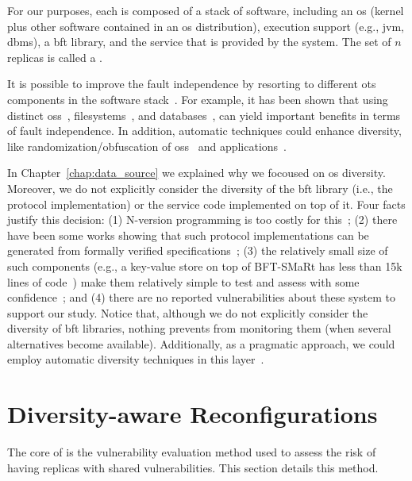 For our purposes, each \replica is composed of a stack of software, including an \gls{os} (kernel plus other software contained in an \gls{os} distribution), execution support (e.g., \gls{jvm}, \gls{dbms}), a \gls{bft} library, and the service that is provided by the system.
The set of $n$ replicas is called a \configuration.

It is possible to improve the \replicas fault independence by resorting to different \gls{ots} components in the software stack~\cite{Deswarte:1998}. 
For example, it has been shown that using distinct \glspl{os}~\cite{Garcia:2014}, filesystems~\cite{Castro:2003,Bairavasundaram:2009,Alagappan:2016}, and databases~\cite{Gashi:2007}, can yield important benefits in terms of fault independence. In addition, automatic techniques could enhance diversity, like randomization/obfuscation of \glspl{os}~\cite{Roeder:2010} and applications~\cite{King:2016}.

In Chapter~\ref{chap:data_source} we explained why we focoused on \gls{os} diversity. 
Moreover, we do not explicitly consider the diversity of the \gls{bft} library (i.e., the protocol implementation) or the service code implemented on top of it.
Four facts justify this decision: (1) N-version programming is too costly for this~\cite{Avizienis:1977}; (2) there have been some works showing that such protocol implementations can be generated from formally verified specifications~\cite{Hawblitzel:2015,Rahli:2018}; (3) the relatively small size of such components (e.g., a key-value store on top of BFT-SMaRt has less than 15k lines of code~\cite{Bessani:2014}) make them relatively simple to test and assess with some confidence~\cite{Martins:2013,Lee:2014};  and (4) there are no reported vulnerabilities about these system to support our study.
Notice that, although we do not explicitly consider the diversity of \gls{bft} libraries, nothing prevents \system from monitoring them (when several alternatives become available). 
Additionally, as a pragmatic approach, we could employ automatic diversity techniques in this layer~\cite{Platania:2014,Roeder:2010}.




\section{Diversity-aware Reconfigurations}
\label{sec:metric}

The core of \system is the vulnerability evaluation method used to assess the risk of having replicas with shared vulnerabilities.
This section details this method.

